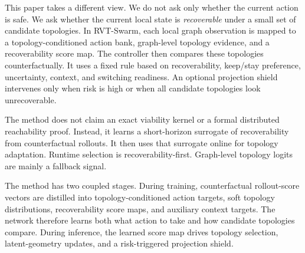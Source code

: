 \documentclass{ieeeaccess}
\begin{document}
This paper takes a different view. We do not ask only whether the
current action is safe. We ask whether the current local state is
\emph{recoverable} under a small set of candidate topologies. In
RVT-Swarm, each local graph observation is mapped to a
topology-conditioned action bank, graph-level topology evidence, and a
recoverability score map. The controller then compares these topologies
counterfactually. It uses a fixed rule based on recoverability,
keep/stay preference, uncertainty, context, and switching readiness. An
optional projection shield intervenes only when risk is high or when
all candidate topologies look unrecoverable.

The method does not claim an exact viability kernel or a formal
distributed reachability proof. Instead, it learns a short-horizon
surrogate of recoverability from counterfactual rollouts. It then uses
that surrogate online for topology adaptation. Runtime selection is
recoverability-first. Graph-level topology logits are mainly a fallback
signal.

The method has two coupled stages. During training, counterfactual
rollout-score vectors are distilled into topology-conditioned action
targets, soft topology distributions, recoverability score maps, and
auxiliary context targets. The network therefore learns both what
action to take and how candidate topologies compare. During inference,
the learned score map drives topology selection, latent-geometry
updates, and a risk-triggered projection shield.
\end{document}
